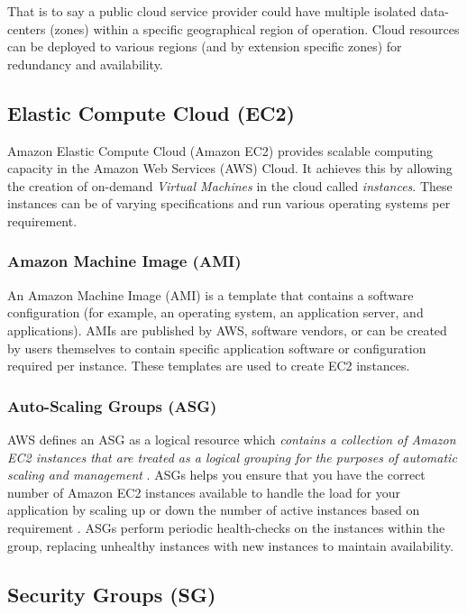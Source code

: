 That is to say a public cloud service provider could have multiple isolated data-centers (zones) within a specific geographical region of operation.
Cloud resources can be deployed to various regions (and by extension specific zones) for redundancy and availability.

\subsection{Elastic Compute Cloud (EC2)}
Amazon Elastic Compute Cloud (Amazon EC2) provides scalable computing capacity in the Amazon Web Services (AWS) Cloud\cite{awsdocs_whatsisec2}.
It achieves this by allowing the creation of on-demand \emph{Virtual Machines} in the cloud called \emph{instances}\cite{carty_2019}. 
These instances can be of varying specifications \cite{daly_2022} and run various operating systems \cite{awsdocs_ec2os} per requirement.

\subsubsection{Amazon Machine Image (AMI)}
An Amazon Machine Image (AMI) is a template that contains a software configuration (for example, an operating system, an application server, and applications)\cite{awsdocs_ami}.
AMIs are published by AWS, software vendors, or can be created by users themselves to contain specific application software or configuration required per instance.
These templates are used to create EC2 instances\cite{Beach2014}. 

\subsubsection{Auto-Scaling Groups (ASG)}
AWS defines an ASG as a logical resource which \emph{contains a collection of Amazon EC2 instances that are treated as a logical grouping for the purposes of automatic scaling and management} \cite{awsdocs_asg}.
ASGs helps you ensure that you have the correct number of Amazon EC2 instances available to handle the load for your application by scaling up or down the number of active instances based on requirement \cite{amazon_asg_docs}. 
ASGs perform periodic health-checks on the instances within the group, replacing unhealthy instances with new instances to maintain availability.

\subsection{Security Groups (SG)}

